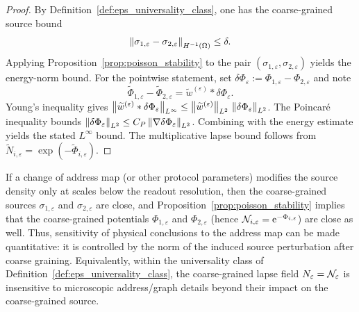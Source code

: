 \begin{proof}
By Definition~\ref{def:eps_universality_class}, one has the coarse-grained source bound
\[
\left\lVert \sigma_{1,\varepsilon}-\sigma_{2,\varepsilon}\right\rVert_{H^{-1}(\Omega)}\le \delta.
\]
Applying Proposition~\ref{prop:poisson_stability} to the pair $(\sigma_{1,\varepsilon},\sigma_{2,\varepsilon})$ yields the energy-norm bound.
For the pointwise statement, set $\delta\Phi_\varepsilon:=\Phi_{1,\varepsilon}-\Phi_{2,\varepsilon}$ and note
\[
\widetilde\Phi_{1,\varepsilon}-\widetilde\Phi_{2,\varepsilon}
=\widetilde w^{(\varepsilon)}\ast\delta\Phi_\varepsilon.
\]
Young's inequality gives $\left\lVert \widetilde w^{(\varepsilon)}\ast\delta\Phi_\varepsilon\right\rVert_{L^\infty}\le \left\lVert \widetilde w^{(\varepsilon)}\right\rVert_{L^2}\,\left\lVert \delta\Phi_\varepsilon\right\rVert_{L^2}$.
The Poincar\'e inequality bounds $\left\lVert \delta\Phi_\varepsilon\right\rVert_{L^2}\le C_P \left\lVert \nabla\delta\Phi_\varepsilon\right\rVert_{L^2}$.
Combining with the energy estimate yields the stated $L^\infty$ bound.
The multiplicative lapse bound follows from $\widetilde N_{i,\varepsilon}=\exp(-\widetilde\Phi_{i,\varepsilon})$.
\end{proof}

\begin{remark}
\label{rem:robustness_eps}
If a change of address map (or other protocol parameters) modifies the source density only at scales below the readout resolution, then the coarse-grained sources $\sigma_{1,\varepsilon}$ and $\sigma_{2,\varepsilon}$ are close, and Proposition~\ref{prop:poisson_stability} implies that the coarse-grained potentials $\Phi_{1,\varepsilon}$ and $\Phi_{2,\varepsilon}$ (hence $\mathcal{N}_{i,\varepsilon}=\mathrm{e}^{-\Phi_{i,\varepsilon}}$) are close as well.
Thus, sensitivity of physical conclusions to the address map can be made quantitative: it is controlled by the norm of the induced source perturbation after coarse graining.
Equivalently, within the universality class of Definition~\ref{def:eps_universality_class}, the coarse-grained lapse field $N_\varepsilon=\mathcal{N}_\varepsilon$ is insensitive to microscopic address/graph details beyond their impact on the coarse-grained source.
\end{remark}



